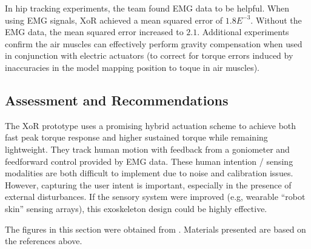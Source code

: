 In hip tracking experiments, the team found EMG data to be helpful.  When using EMG signals, XoR achieved a mean squared error of $1.8E^{-3}$.  Without the EMG data, the mean squared error increased to $2.1$.  Additional experiments confirm the air muscles can effectively perform gravity compensation when used in conjunction with electric actuators (to correct for torque errors induced by inaccuracies in the model mapping position to toque in air muscles).


\subsection{Assessment and Recommendations}

The XoR prototype uses a promising hybrid actuation scheme to achieve both fast peak torque response and higher sustained torque while remaining lightweight.  They track human motion with feedback from a goniometer and feedforward control provided by EMG data.  These human intention / sensing modalities are both difficult to implement due to noise and calibration issues.  However, capturing the user intent is important, especially in the presence of external disturbances.  If the sensory system were improved (e.g, wearable ``robot skin'' sensing arrays), this exoskeleton design could be highly effective. 


% 
% 

The figures in this section were obtained from \cite{xorDesign2011,XoRkinemExtraction2012}. Materials presented are based on the references above.